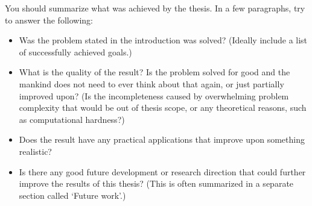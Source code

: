 

You should summarize what was achieved by the thesis. In a few paragraphs, try to answer the following:
\begin{itemize}
\item Was the problem stated in the introduction was solved? (Ideally include a list of successfully achieved goals.)
\item What is the quality of the result? Is the problem solved for good and the mankind does not need to ever think about that again, or just partially improved upon? (Is the incompleteness caused by overwhelming problem complexity that would be out of thesis scope, or any theoretical reasons, such as computational hardness?)
\item Does the result have any practical applications that improve upon something realistic?
\item Is there any good future development or research direction that could further improve the results of this thesis? (This is often summarized in a separate section called `Future work'.)
\end{itemize}

